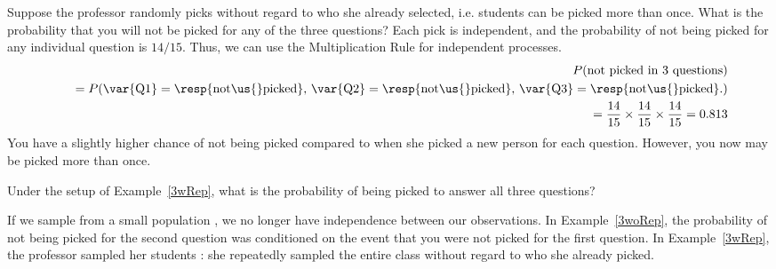 \begin{examplewrap}
\begin{nexample}{Suppose the professor randomly picks without regard to who she already selected, i.e. students can be picked more than once. What is the probability that you will not be picked for any of the three questions?}\label{3wRep}
Each pick is independent, and the probability of not being picked for any individual question is $14/15$. Thus, we can use the Multiplication Rule for independent processes.
\begin{eqnarray*}
&&P(\text{not picked in 3 questions}) \\
&&\quad = P(\text{\var{Q1}} = \text{\resp{not\us{}picked}, }\text{\var{Q2}} = \text{\resp{not\us{}picked}, }\text{\var{Q3}} = \text{\resp{not\us{}picked}.}) \\
&&\quad = \frac{14}{15}\times\frac{14}{15}\times\frac{14}{15} = 0.813
\end{eqnarray*}
You have a slightly higher chance of not being picked compared to when she picked a new person for each question. However, you now may be picked more than once.
\end{nexample}
\end{examplewrap}

\D{\newpage}

\begin{exercisewrap}
\begin{nexercise}
Under the setup of Example~\ref{3wRep}, what is the probability of being picked to answer all three questions?\footnotemark
\end{nexercise}
\end{exercisewrap}

If we sample from a small population , we no longer have independence between our observations. In Example~\ref{3woRep}, the probability of not being picked for the second question was conditioned on the event that you were not picked for the first question. In Example~\ref{3wRep}, the professor sampled her students : she repeatedly sampled the entire class without regard to who she already picked.

